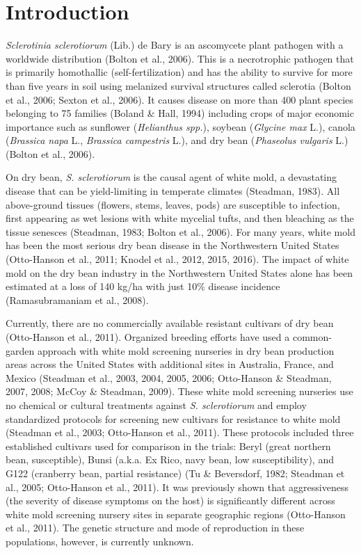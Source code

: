 \section*{Introduction}\label{introduction}

\emph{Sclerotinia sclerotiorum} (Lib.) de Bary is an ascomycete plant
pathogen with a worldwide distribution (Bolton et al., 2006). This is a
necrotrophic pathogen that is primarily homothallic (self-fertilization)
and has the ability to survive for more than five years in soil using
melanized survival structures called sclerotia (Bolton et al., 2006;
Sexton et al., 2006). It causes disease on more than 400 plant species
belonging to 75 families (Boland \& Hall, 1994) including crops of major
economic importance such as sunflower (\emph{Helianthus spp.}), soybean
(\emph{Glycine max} L.), canola (\emph{Brassica napa} L., \emph{Brassica
campestris} L.), and dry bean (\emph{Phaseolus vulgaris} L.) (Bolton et
al., 2006).

On dry bean, \emph{S. sclerotiorum} is the causal agent of white mold, a
devastating disease that can be yield-limiting in temperate climates
(Steadman, 1983). All above-ground tissues (flowers, stems, leaves,
pods) are susceptible to infection, first appearing as wet lesions with
white mycelial tufts, and then bleaching as the tissue senesces
(Steadman, 1983; Bolton et al., 2006). For many years, white mold has
been the most serious dry bean disease in the Northwestern United States
(Otto-Hanson et al., 2011; Knodel et al., 2012, 2015, 2016). The impact
of white mold on the dry bean industry in the Northwestern United States
alone has been estimated at a loss of 140 kg/ha with just 10\% disease
incidence (Ramasubramaniam et al., 2008).

Currently, there are no commercially available resistant cultivars of
dry bean (Otto-Hanson et al., 2011). Organized breeding efforts have
used a common-garden approach with white mold screening nurseries in dry
bean production areas across the United States with additional sites in
Australia, France, and Mexico (Steadman et al., 2003, 2004, 2005, 2006;
Otto-Hanson \& Steadman, 2007, 2008; McCoy \& Steadman, 2009). These
white mold screening nurseries use no chemical or cultural treatments
against \emph{S. sclerotiorum} and employ standardized protocols for
screening new cultivars for resistance to white mold (Steadman et al.,
2003; Otto-Hanson et al., 2011). These protocols included three
established cultivars used for comparison in the trials: Beryl (great
northern bean, susceptible), Bunsi (a.k.a. Ex Rico, navy bean, low
susceptibility), and G122 (cranberry bean, partial resistance) (Tu \&
Beversdorf, 1982; Steadman et al., 2005; Otto-Hanson et al., 2011). It
was previously shown that aggressiveness (the severity of disease
symptoms on the host) is significantly different across white mold
screening nursery sites in separate geographic regions (Otto-Hanson et
al., 2011). The genetic structure and mode of reproduction in these
populations, however, is currently unknown.

